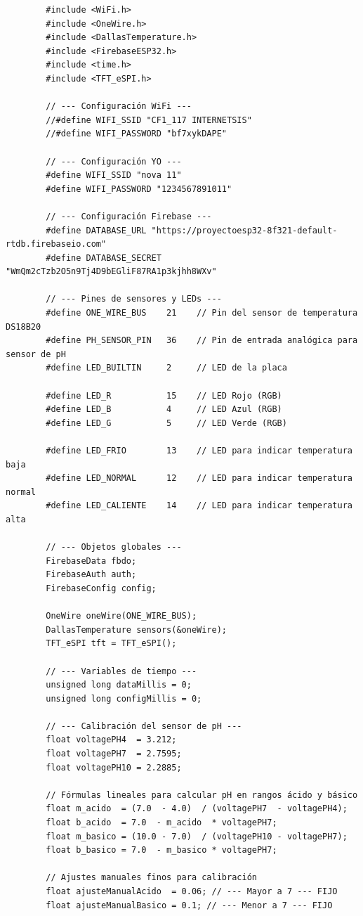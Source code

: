 \documentclass[a4paper,12pt]{article}
\begin{document}
	\begin{verbatim}
		#include <WiFi.h>
		#include <OneWire.h>
		#include <DallasTemperature.h>
		#include <FirebaseESP32.h>
		#include <time.h>
		#include <TFT_eSPI.h> 
		
		// --- Configuración WiFi ---
		//#define WIFI_SSID "CF1_117 INTERNETSIS"
		//#define WIFI_PASSWORD "bf7xykDAPE"
		
		// --- Configuración YO ---
		#define WIFI_SSID "nova 11"
		#define WIFI_PASSWORD "1234567891011"
		
		// --- Configuración Firebase ---
		#define DATABASE_URL "https://proyectoesp32-8f321-default-rtdb.firebaseio.com"
		#define DATABASE_SECRET "WmQm2cTzb2O5n9Tj4D9bEGliF87RA1p3kjhh8WXv"
		
		// --- Pines de sensores y LEDs ---
		#define ONE_WIRE_BUS    21    // Pin del sensor de temperatura DS18B20
		#define PH_SENSOR_PIN   36    // Pin de entrada analógica para sensor de pH
		#define LED_BUILTIN     2     // LED de la placa
		
		#define LED_R           15    // LED Rojo (RGB)
		#define LED_B           4     // LED Azul (RGB)
		#define LED_G           5     // LED Verde (RGB)
		
		#define LED_FRIO        13    // LED para indicar temperatura baja
		#define LED_NORMAL      12    // LED para indicar temperatura normal
		#define LED_CALIENTE    14    // LED para indicar temperatura alta
		
		// --- Objetos globales ---
		FirebaseData fbdo;
		FirebaseAuth auth;
		FirebaseConfig config;
		
		OneWire oneWire(ONE_WIRE_BUS);
		DallasTemperature sensors(&oneWire);
		TFT_eSPI tft = TFT_eSPI();
		
		// --- Variables de tiempo ---
		unsigned long dataMillis = 0;
		unsigned long configMillis = 0;
		
		// --- Calibración del sensor de pH ---
		float voltagePH4  = 3.212;
		float voltagePH7  = 2.7595;
		float voltagePH10 = 2.2885;
		
		// Fórmulas lineales para calcular pH en rangos ácido y básico
		float m_acido  = (7.0  - 4.0)  / (voltagePH7  - voltagePH4);
		float b_acido  = 7.0  - m_acido  * voltagePH7;
		float m_basico = (10.0 - 7.0)  / (voltagePH10 - voltagePH7);
		float b_basico = 7.0  - m_basico * voltagePH7;
		
		// Ajustes manuales finos para calibración
		float ajusteManualAcido  = 0.06; // --- Mayor a 7 --- FIJO 
		float ajusteManualBasico = 0.1; // --- Menor a 7 --- FIJO
		

\end{verbatim}
\end{document}
